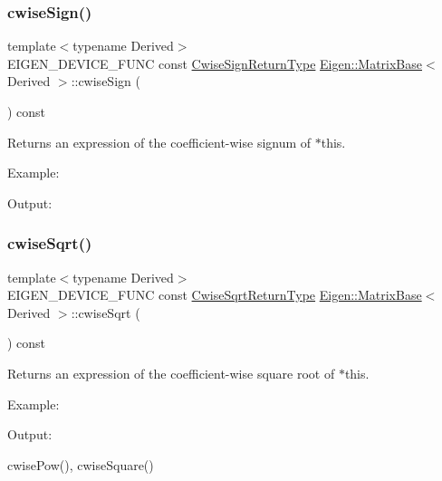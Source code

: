 \subsubsection{\texorpdfstring{cwiseSign()}{cwiseSign()}}
{\footnotesize\ttfamily template$<$typename Derived$>$ \\
E\+I\+G\+E\+N\+\_\+\+D\+E\+V\+I\+C\+E\+\_\+\+F\+U\+NC const \mbox{\hyperlink{class_eigen_1_1_cwise_unary_op}{Cwise\+Sign\+Return\+Type}} \mbox{\hyperlink{class_eigen_1_1_matrix_base}{Eigen\+::\+Matrix\+Base}}$<$ Derived $>$\+::cwise\+Sign (\begin{DoxyParamCaption}{ }\end{DoxyParamCaption}) const\hspace{0.3cm}{\ttfamily [inline]}}

\begin{DoxyReturn}{Returns}
an expression of the coefficient-\/wise signum of $\ast$this.
\end{DoxyReturn}
Example\+: 
\begin{DoxyCodeInclude}{0}
\end{DoxyCodeInclude}
 Output\+: 
\begin{DoxyVerbInclude}
\end{DoxyVerbInclude}
 \mbox{\label{class_eigen_1_1_matrix_base_a8ceab546dd934174888bea8b7514ea47}} 
\subsubsection{\texorpdfstring{cwiseSqrt()}{cwiseSqrt()}}
{\footnotesize\ttfamily template$<$typename Derived$>$ \\
E\+I\+G\+E\+N\+\_\+\+D\+E\+V\+I\+C\+E\+\_\+\+F\+U\+NC const \mbox{\hyperlink{class_eigen_1_1_cwise_unary_op}{Cwise\+Sqrt\+Return\+Type}} \mbox{\hyperlink{class_eigen_1_1_matrix_base}{Eigen\+::\+Matrix\+Base}}$<$ Derived $>$\+::cwise\+Sqrt (\begin{DoxyParamCaption}{ }\end{DoxyParamCaption}) const\hspace{0.3cm}{\ttfamily [inline]}}

\begin{DoxyReturn}{Returns}
an expression of the coefficient-\/wise square root of $\ast$this.
\end{DoxyReturn}
Example\+: 
\begin{DoxyCodeInclude}{0}
\end{DoxyCodeInclude}
 Output\+: 
\begin{DoxyVerbInclude}
\end{DoxyVerbInclude}
 cwise\+Pow(), cwise\+Square() \mbox{\label{class_eigen_1_1_matrix_base_a7ad8f77004bb956b603bb43fd2e3c061}} 
